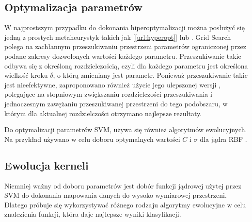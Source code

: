 \subsection{Optymalizacja parametrów}
W najprostszym przypadku do dokonania hiperoptymalizacji można posłużyć się jedną z prostych metaheurystyk takich jak  [\ref{url:hyperopt}] lub  \cite{practical_2003}. Grid Search polega na zachłannym przeszukiwaniu przestrzeni parametrów ograniczonej przez podane zakresy dozwolonych wartości każdego parametru. Przeszukiwanie takie odbywa się z określoną rozdzielczością, czyli dla każdego parametru jest określona wielkość kroku $ \delta $, o którą zmieniany jest parametr. Ponieważ przeszukiwanie takie jest nieefektywne, zaproponowano również użycie jego ulepszonej wersji \cite{staelin_parameter_2003}, polegające na stopniowym zwiększaniu rozdzielczości przeszukiwania i jednoczesnym zawężaniu przeszukiwanej przestrzeni do tego podobszaru, w którym dla aktualnej rozdzielczości otrzymano najlepsze rezultaty.


Do optymalizacji parametrów SVM, używa się również algorytmów ewolucyjnych. Na przykład używano  w celu doboru optymalnych wartości $ C $ i $ \sigma $ dla jądra RBF \cite{runarsson_asynchronous_2004}.

\subsection{Ewolucja kerneli} 
Niemniej ważny od doboru parametrów jest dobór funkcji jądrowej użytej przez SVM do dokonania mapowania danych do wysoko wymiarowej przestrzeni. Dlatego próbuje się wykorzystywać różnego rodzaju algorytmy ewolucyjne w celu znalezienia funkcji, która daje najlepsze wyniki klasyfikacji.

